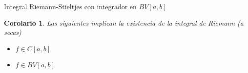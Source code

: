 \documentclass[a4paper]{article}\usepackage{/home/alonso/Documents/Projects/formularios/styles}
\theoremstyle{mytheoremstyle}
\newtheorem{cor}{Corolario}[theorem]
\newcommand{\1}{\mathds{1}}
\begin{document}
\begin{multicols*}{3}
\begin{roundbox}{Integral Riemann-Stieltjes con integrador en $BV[a,b] $}
	\begin{cor}
		Las siguientes implican la existencia de la integral de Riemann (a secas)
		\begin{itemize}
			\item $ f \in C[a,b] $
			\item $ f \in BV[a,b] $
		\end{itemize}
	\end{cor}

\end{roundbox}

\end{multicols*}
\end{document}
